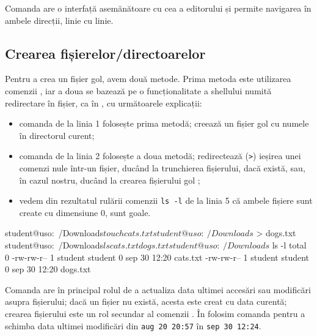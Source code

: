 Comanda  are o interfață asemănătoare cu cea a editorului  și permite navigarea în ambele direcții, linie cu linie.

\subsection{Crearea fișierelor/directoarelor}
\label{sec:fs:file-create}

Pentru a crea un fișier gol, avem două metode.
Prima metoda este utilizarea comenzii , iar a doua se bazează pe o funcționalitate a shellului numită redirectare în fișier, ca în , cu următoarele explicații:

\begin{itemize}
  \item comanda de la linia 1 folosește prima metodă;
    creează un fișier gol cu numele  în directorul curent;
  \item comanda de la linia 2 folosește a doua metodă;
    redirectează (\texttt{>}) ieșirea unei comenzi nule într-un fișier, ducând la trunchierea fișierului, dacă există, sau, în cazul nostru, ducând la crearea fișierului gol ;
  \item vedem din rezultatul rulării comenzii \texttt{ls -l} de la linia 5 că ambele fișiere sunt create cu dimensiune 0, sunt goale.
\end{itemize}

\begin{screen}[caption={Crearea unui fișier},label={lst:fs:create-file}]
student@uso:~/Downloads$ touch cats.txt
student@uso:~/Downloads$ > dogs.txt
student@uso:~/Downloads$ ls
cats.txt  dogs.txt
student@uso:~/Downloads$ ls -l
total 0
-rw-rw-r-- 1 student student 0 sep 30 12:20 cats.txt
-rw-rw-r-- 1 student student 0 sep 30 12:20 dogs.txt
\end{screen}

Comanda  are în principal rolul de a actualiza data ultimei accesări sau modificări asupra fișierului;
dacă un fișier nu există, acesta este creat cu data curentă;
crearea fișierului este un rol secundar al comenzii .
În  folosim comanda  pentru a schimba data ultimei modificări din \texttt{aug 20 20:57} în \texttt{sep 30 12:24}.



